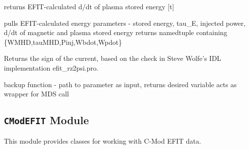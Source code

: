 \documentclass[letterpaper,10pt,english]{sphinxmanual}
\begin{document}
\begin{fulllineitems}
\begin{fulllineitems}
\label{eqtools:eqtools.EFIT.EFITTree.getWpdot}
returns EFIT-calculated d/dt of plasma stored energy {[}t{]}

\end{fulllineitems}


\begin{fulllineitems}
\label{eqtools:eqtools.EFIT.EFITTree.getEnergy}
pulls EFIT-calculated energy parameters - stored energy, tau\_E, injected power, d/dt of magnetic and plasma stored energy
returns namedtuple containing \{WMHD,tauMHD,Pinj,Wbdot,Wpdot\}

\end{fulllineitems}


\begin{fulllineitems}
\label{eqtools:eqtools.EFIT.EFITTree.getCurrentSign}
Returns the sign of the current, based on the check in Steve Wolfe's
IDL implementation efit\_rz2psi.pro.

\end{fulllineitems}


\begin{fulllineitems}
\label{eqtools:eqtools.EFIT.EFITTree.getParam}
backup function - path to parameter as input, returns desired variable
acts as wrapper for MDS call

\end{fulllineitems}


\end{fulllineitems}



\subsection{\texttt{CModEFIT} Module}
\label{eqtools:module-eqtools.CModEFIT}\label{eqtools:cmodefit-module}
This module provides classes for working with C-Mod EFIT data.
\end{document}
